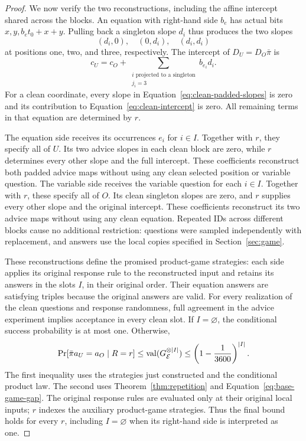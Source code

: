 \begin{proof}
We now verify the two reconstructions, including the affine intercept
shared across the blocks.  An equation with right-hand side $b_e$ has actual
bits $x,y,b_e t_0+x+y$.  Pulling back a singleton slope $d_i$ thus
produces the two slopes
\begin{equation}
 (d_i,0),\quad (0,d_i),\quad (d_i,d_i)
 \label{eq:clean-padded-slopes}
\end{equation}
at positions one, two, and three, respectively.  The intercept of
$D_U=D_O\bar\pi$ is
\begin{equation}
 c_U=c_O+
 \sum_{\substack{i\text{ projected to a singleton}\\j_i=3}}
 b_{e_i}d_i.
 \label{eq:clean-intercept}
\end{equation}
For a clean coordinate, every slope in
Equation~\eqref{eq:clean-padded-slopes} is zero and its contribution to
Equation~\eqref{eq:clean-intercept} is zero.  All remaining terms in
that equation are determined by $r$.

The equation side receives its occurrences $e_i$ for $i\in I$.
Together with $r$, they specify all of $U$.  Its two advice slopes in
each clean block are zero, while $r$ determines every other slope and
the full intercept.  These coefficients reconstruct both padded advice
maps without using any clean selected position or variable question.
The variable side receives the variable question for each $i\in I$.
Together with $r$, these specify all of $O$.  Its clean singleton
slopes are zero, and $r$ supplies every other slope and the original
intercept.  These coefficients reconstruct its two advice maps without
using any clean equation.  Repeated IDs across different blocks cause no
additional restriction: questions were sampled independently with
replacement, and answers use the local copies specified in
Section~\ref{sec:game}.

These reconstructions define the promised product-game strategies:
each side applies its original response rule to the reconstructed
input and retains its answers in the slots $I$, in their original
order.  Their equation answers are satisfying triples because the
original answers are valid.  For every realization of the clean
questions and response randomness, full agreement in the advice
experiment implies acceptance in every clean slot.  If $I=\varnothing$,
the conditional success probability is at most one.  Otherwise,
\[
 \Pr[\bar\pi a_U=a_O\mid R=r]
 \le \operatorname{val}(G_{\mathcal E}^{\otimes\lvert I\rvert})
 \le \left(1-\frac{1}{3600}\right)^{\lvert I\rvert}.
\]
The first inequality uses the strategies just constructed and the
conditional product law.  The second uses
Theorem~\ref{thm:repetition} and Equation~\eqref{eq:base-game-gap}.
The original response rules are evaluated only at their original
local inputs; $r$ indexes the auxiliary product-game strategies.
Thus the final bound holds for every $r$, including $I=\varnothing$
when its right-hand side is interpreted as one.


\end{proof}
